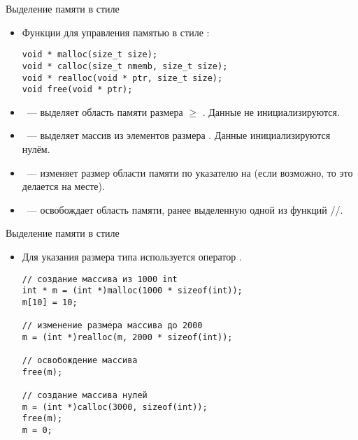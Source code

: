 \documentclass{beamer}
\begin{document}
\begin{frame}[fragile]{Выделение памяти в стиле \langc}
    \begin{itemize}
        \item Функции для управления памятью в стиле \langc:
            {\small
\begin{lstlisting}
void * malloc(size_t size);
void * calloc(size_t nmemb, size_t size);
void * realloc(void * ptr, size_t size);
void free(void * ptr);               
\end{lstlisting}
}
        \item {}~--- выделяет область памяти размера $\ge$
            . Данные не инициализируются.
        \item {}~--- выделяет массив из  элементов  размера 
            . Данные инициализируются нулём.
        \item {}~--- изменяет размер области памяти по указателю
             на  (если возможно, то это делается на месте).
        \item {}~--- освобождает область памяти, ранее выделенную
            одной из функций //.
    \end{itemize}
\end{frame}

\begin{frame}[fragile]{Выделение памяти в стиле \langc}
    \begin{itemize}
        \item Для указания размера типа используется оператор .
\begin{lstlisting}
// создание массива из 1000 int    
int * m = (int *)malloc(1000 * sizeof(int));
m[10] = 10;

// изменение размера массива до 2000
m = (int *)realloc(m, 2000 * sizeof(int));

// освобождение массива
free(m);

// создание массива нулей
m = (int *)calloc(3000, sizeof(int));
free(m);
m = 0;
\end{lstlisting}
    \end{itemize}
\end{frame}
\end{document}
